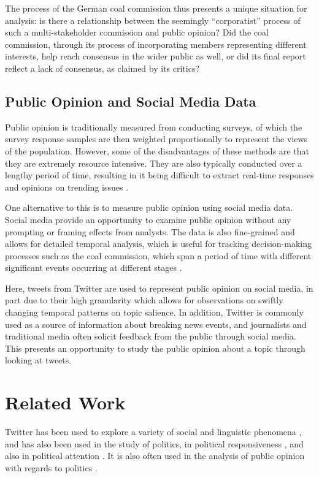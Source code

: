 \documentclass[12pt,onecolumn,twoside]{layout}
\begin{document}
The process of the German coal commission thus presents a unique situation for analysis: is there a relationship between the seemingly ``corporatist'' process of such a multi-stakeholder commission and public opinion? Did the coal commission, through its process of incorporating members representing different interests, help reach consensus in the wider public as well, or did its final report reflect a lack of consensus, as claimed by its critics?

\subsection*{Public Opinion and Social Media Data} %
Public opinion is traditionally measured from conducting surveys, of which the survey response samples are then weighted proportionally to represent the views of the population. However, some of the disadvantages of these methods are that they are extremely resource intensive. They are also typically conducted over a lengthy period of time, resulting in it being difficult to extract real-time responses and opinions on trending issues \citep{Klasnja2018}.

One alternative to this is to measure public opinion using social media data. Social media provide an opportunity to examine public opinion without any prompting or framing effects from analysts. The data is also fine-grained and allows for detailed temporal analysis, which is useful for tracking decision-making processes such as the coal commission, which span a period of time with different significant events occurring at different stages \citep{Klasnja2018}.

Here, tweets from Twitter are used to represent public opinion on social media, in part due to their high granularity which allows for observations on swiftly changing temporal patterns on topic salience. In addition, Twitter is commonly used as a source of information about breaking news events, and journalists and traditional media often solicit feedback from the public through social media. This presents an opportunity to study the public opinion about a topic through looking at tweets.

\section{Related Work} \label{sec:relatedwork}
Twitter has been used to explore a variety of social and linguistic phenomena \citep{Cao2012, Lin2013, Lin2014}, and has also been used in the study of politics, in political responsiveness \citep{Barbera2019}, and also in political attention \citep{Hemphill2014, Shapiro2017}. It is also often used in the analysis of public opinion with regards to politics \citep{DiGrazia2013, Vaccari2013, Barbera2019}.
\end{document}
